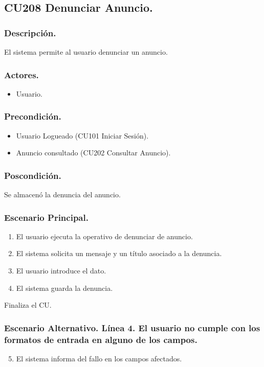 \subsection{CU208 Denunciar Anuncio.}
\subsubsection{Descripci\'{o}n.}
El sistema permite al usuario denunciar un anuncio.
\subsubsection{Actores.}
\begin{itemize}
\item Usuario.
\end{itemize}
\subsubsection{Precondici\'{o}n.}
\begin{itemize}
\item Usuario Logueado (CU101 Iniciar Sesi\'{o}n).
\item Anuncio consultado (CU202 Consultar Anuncio).
\end{itemize}
\subsubsection{Poscondici\'{o}n.}
Se almacen\'{o} la denuncia del anuncio.
\subsubsection{Escenario Principal.}
\begin{enumerate}
\item El usuario ejecuta la operativo de denunciar de anuncio.
\item El sistema solicita un mensaje y un t\'{i}tulo asociado a la denuncia.
\item El usuario introduce el dato.
\item El sistema guarda la denuncia.
\end{enumerate}
Finaliza el CU.
\subsubsection{Escenario Alternativo. L\'{i}nea 4. El usuario no cumple con los formatos de entrada en alguno de los campos.}
\begin{enumerate}
\setcounter{enumi}{4}
\item El sistema informa del fallo en los campos afectados.
\end{enumerate}

